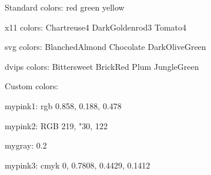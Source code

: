 \documentclass[10pt]{article}
\begin{document}
Standard colors:
\color{red} red
\color{green} green
\color{yellow} yellow

x11 colors:
\color{Chartreuse4} Chartreuse4
\color{DarkGoldenrod3} DarkGoldenrod3
\color{Tomato4} Tomato4

svg colors:
\color{BlanchedAlmond} BlanchedAlmond
\color{Chocolate} Chocolate
\color{DarkOliveGreen} DarkOliveGreen

dvips colors:
\color{Bittersweet} Bittersweet
\color{BrickRed} BrickRed
\color{Plum} Plum
\color{JungleGreen} JungleGreen 

Custom colors:

\indent
\color{mypink1} mypink1: rgb 0.858, 0.188, 0.478

\indent
\color{mypink2} mypink2: RGB 219, "30, 122

\indent
{}%
\color{mygray} mygray: 0.2

\indent
%
\color{mypink3} mypink3: cmyk 0, 0.7808, 0.4429, 0.1412
\end{document}
